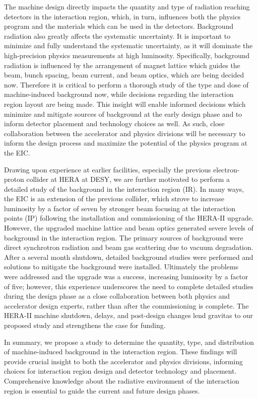 
The machine design directly impacts the quantity and type of radiation reaching detectors in the interaction region, which, in turn, influences both the physics program and the materials which can be used in the detectors.  Background radiation also greatly affects the systematic uncertainty.  It is important to minimize and fully understand the systematic uncertainty, as it will dominate the high-precision physics measurements at high luminosity.  Specifically, background radiation is influenced by the arrangement of magnet lattice which guides the beam, bunch spacing, beam current, and beam optics, which are being decided now.  Therefore it is critical to perform a thorough study of the type and dose of machine-induced background now, while decisions regarding the interaction region layout are being made.  This insight will enable informed decisions which minimize and mitigate sources of background at the early design phase and to inform detector placement and technology choices as well.  As such, close collaboration between the accelerator and physics divisions will be necessary to inform the design process and maximize the potential of the physics program at the EIC.

Drawing upon experience at earlier facilities, especially the previous electron-proton collider at HERA at DESY, we are further motivated to perform a detailed study of the background in the interaction region (IR).  In many ways, the EIC is an extension of the previous collider, which strove to increase luminosity by a factor of seven by stronger beam focusing at the interaction points (IP) following the installation and commissioning of the HERA-II upgrade.  However, the upgraded machine lattice and beam optics generated severe levels of background in the interaction region.  The primary sources of background were direct synchrotron radiation and beam gas scattering due to vacuum degradation.  After a several month shutdown, detailed background studies were performed and solutions to mitigate the background were installed.  Ultimately the problems were addressed and the upgrade was a success, increasing luminosity by a factor of five; however, this experience underscores the need to complete detailed studies during the design phase as a close collaboration between both physics and accelerator design experts, rather than after the commissioning is complete.  The HERA-II machine shutdown, delays, and post-design changes lend gravitas to our proposed study and strengthens the case for funding\cite{Holzer:2009}\cite{Seidel:2004}. 

In summary, we propose a study to determine the quantity, type, and distribution of machine-induced background in the interaction region.  These findings will provide crucial insight to both the accelerator and physics divisions, informing choices for interaction region design and detector technology and placement.  Comprehensive knowledge about the radiative environment of the interaction region is essential to guide the current and future design phases.

